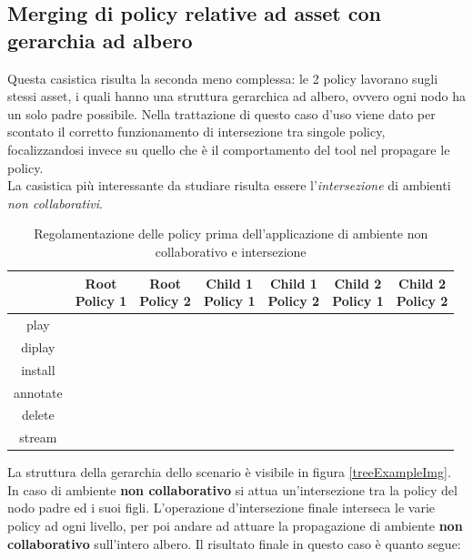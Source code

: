 \documentclass[12pt,a4paper,twoside]{book}
\begin{document}
\subsection{Merging di policy relative ad asset con gerarchia ad albero}
Questa casistica risulta la seconda meno complessa: le 2 policy lavorano sugli stessi asset, i quali hanno una struttura gerarchica ad albero, ovvero ogni nodo ha un solo padre possibile. Nella trattazione di questo caso d'uso viene dato per scontato il corretto funzionamento di intersezione tra singole policy, focalizzandosi invece su quello che è il comportamento del tool nel propagare le policy.\\
La casistica più interessante da studiare risulta essere l'\textit{intersezione} di ambienti \textit{non collaborativi}.
\begin{table}[H]
\begin{tabular}{|c|c|c|c|c|c|c|}
\hline
{} & \makecell{\textbf{Root} \\\textbf{Policy 1}} & \makecell{\textbf{Root} \\\textbf{Policy 2}} & \makecell{\textbf{Child 1} \\\textbf{Policy 1}} & \makecell{\textbf{Child 1} \\\textbf{Policy 2}} & \makecell{\textbf{Child 2} \\\textbf{Policy 1}} & \makecell{\textbf{Child 2} \\\textbf{Policy 2}} \\
\hline
{play} & \cellcolor{green!25} & \cellcolor{green!25} & {} & {} & {} & {} \\
\hline
{diplay} & \cellcolor{green!25}& \cellcolor{green!25} & {} & \cellcolor{green!25} & {} & {} \\
\hline
{install} & \cellcolor{green!25} & \cellcolor{green!25} & \cellcolor{green!25} & \cellcolor{green!25} & {} &\cellcolor{green!25} \\
\hline
{annotate} & \cellcolor{green!25} & {} & {} & {} & \cellcolor{green!25} & \cellcolor{red!25} \\
\hline
{delete} & \cellcolor{red!25} & \cellcolor{red!25} & {}&  {} & \cellcolor{red!25} & {}\\
\hline
{stream} & {} & {} & \cellcolor{red!25} & \cellcolor{red!25} & {} &  {}\\
\hline

\end{tabular}
\caption{Regolamentazione delle policy prima dell'applicazione di ambiente non collaborativo e intersezione}
\label{tableTree}
\end{table}
La struttura della gerarchia dello scenario è visibile in figura \ref{treeExampleImg}. In caso di ambiente \textbf{non collaborativo} si attua un'intersezione tra la policy del nodo padre ed i suoi figli. L'operazione d'intersezione finale interseca le varie policy ad ogni livello, per poi andare ad attuare la propagazione di ambiente \textbf{non collaborativo} sull'intero albero. Il risultato finale in questo caso è quanto segue:
\end{document}
